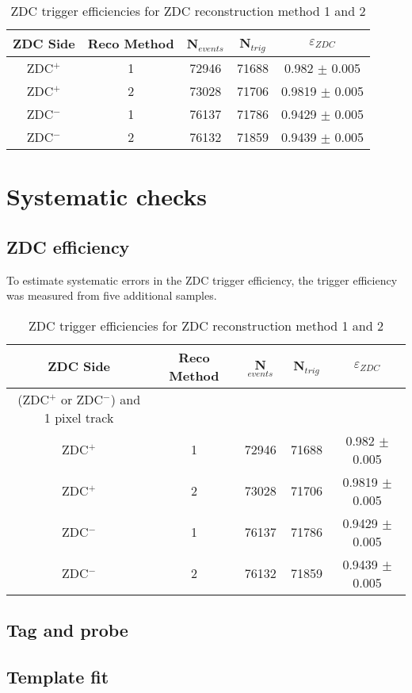      \begin{table}
        \centering
        \begin{tabular}{|c|c|c|c|c|}
           ZDC Side & Reco Method & N$_{events}$ & N$_{trig}$ & $\varepsilon_{ZDC}$ \\ \hline
           ZDC$^{+}$ & 1 & 72946  & 71688 & 0.982 $\pm$ 0.005 \\ \hline
           ZDC$^{+}$ & 2 & 73028  & 71706  & 0.9819  $\pm$ 0.005  \\ \hline
           ZDC$^{-}$ & 1 & 76137  & 71786  & 0.9429  $\pm$ 0.005  \\ \hline
           ZDC$^{-}$ & 2 & 76132  & 71859  & 0.9439  $\pm$ 0.005  \\ \hline
        \end{tabular}
        \caption{ZDC trigger efficiencies for ZDC reconstruction method 1 and 
          2}
        \label{tab:zdcEfficiency}
      \end{table}
  \section{Systematic checks}
    \subsection{ZDC efficiency}
      To estimate systematic errors in the ZDC trigger efficiency, the trigger
        efficiency was measured from five additional samples. 
      \begin{table}
        \centering
        \begin{tabular}{|c|c|c|c|c|}
           ZDC Side & Reco Method & N$_{events}$ & N$_{trig}$ & $\varepsilon_{ZDC}$ \\ \hline
           (ZDC$^{+}$ or ZDC$^{-}$) and 1 pixel track \\ \hline 
           ZDC$^{+}$ & 1 & 72946  & 71688 & 0.982 $\pm$ 0.005 \\ \hline
           ZDC$^{+}$ & 2 & 73028  & 71706  & 0.9819  $\pm$ 0.005  \\ \hline
           ZDC$^{-}$ & 1 & 76137  & 71786  & 0.9429  $\pm$ 0.005  \\ \hline
           ZDC$^{-}$ & 2 & 76132  & 71859  & 0.9439  $\pm$ 0.005  \\ \hline
        \end{tabular}
        \caption{ZDC trigger efficiencies for ZDC reconstruction method 1 and 
          2}
        \label{tab:zdcEfficiencySys}
      \end{table}
      
    \subsection{Tag and probe}
    \subsection{Template fit}
